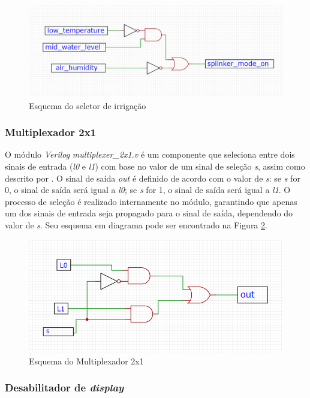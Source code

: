 \documentclass[
	article,			%
	11pt,				%
	oneside,			%
	a4paper,			%
	english,			%
	brazil,				%
	sumario=tradicional
	]{abntex2}
\begin{document}
\begin{figure}[H]
    \centering
    \includegraphics[width=0.75\linewidth]{select.png}
    \caption{Esquema do seletor de irrigação}
    \label{fig:select}
\end{figure}


\subsubsection{Multiplexador 2x1}
O módulo \textit{Verilog} \textit{multiplexer\_2x1.v} é um componente que seleciona entre dois sinais de entrada (\textit{l0} e \textit{l1}) com base no valor de um sinal de seleção \textit{s}, assim como descrito por  \cite{floyd_2007_funes}. O sinal de saída \textit{out} é definido de acordo com o valor de \textit{s}: se \textit{s} for 0, o sinal de saída será igual a \textit{l0}; se \textit{s} for 1, o sinal de saída será igual a \textit{l1}. O processo de seleção é realizado internamente no módulo, garantindo que apenas um dos sinais de entrada seja propagado para o sinal de saída, dependendo do valor de \textit{s}. Seu esquema em diagrama pode ser encontrado na Figura \ref{fig:mux}.

\begin{figure}[H]
    \centering
    \includegraphics[width=0.75\linewidth]{mux.png}
    \caption{Esquema do Multiplexador 2x1}
    \label{fig:mux}
\end{figure}


\subsubsection{Desabilitador de \textit{display}}
\end{document}

